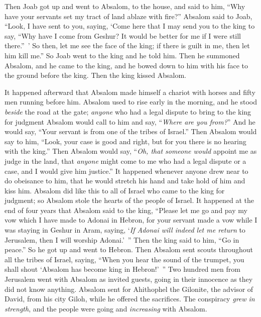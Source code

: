 \begin{biblechapter}
\verse Then Joab got up and went to Absalom, to the house, and said to him, “Why have your servants set my tract of land ablaze with fire?”
\verse Absalom said to Joab, “Look, I have sent to you, saying, ‘Come here that I may send you to the king to say, “Why have I come from Geshur? It would be better for me if I were still there.” ’ So then, let me see the face of the king; if there is guilt in me, then let him kill me.”
\verse So Joab went to the king and he told him. Then he summoned Absalom, and he came to the king, and he bowed down to him with his face to the ground before the king. Then the king kissed Absalom.
\end{biblechapter}

\begin{biblechapter} %
 It happened afterward that Absalom made himself a chariot with horses and fifty men running before him.
\verse Absalom used to rise early in the morning, and he stood \textit{beside} the road at the gate; \textit{anyone} who had a legal dispute to bring to the king for judgment Absalom would call to him and say, “\textit{Where are you from?}” And he would say, “Your servant is from one of the tribes of Israel.”
\verse Then Absalom would say to him, “Look, your case is good and right, but for you there is no hearing with the king.”
\verse Then Absalom would say, “\textit{Oh, that someone would} appoint me as judge in the land, that \textit{anyone} might come to me who had a legal dispute or a case, and I would give him justice.”
\verse It happened whenever anyone drew near to do obeisance to him, that he would stretch his hand and take hold of him and kiss him.
\verse Absalom did like this to all of Israel who came to the king for judgment; so Absalom stole the hearts of the people of Israel.
\verse It happened at the end of four years that Absalom said to the king, “Please let me go and pay my vow which I have made to Adonai in Hebron,
\verse for your servant made a vow while I was staying in Geshur in Aram, saying, ‘\textit{If Adonai will indeed let me return} to Jerusalem, then I will worship Adonai.’ ”
\verse Then the king said to him, “Go in peace.” So he got up and went to Hebron.
\verse Then Absalom sent scouts throughout all the tribes of Israel, saying, “When you hear the sound of the trumpet, you shall shout ‘Absalom has become king in Hebron!’ ”
\verse Two hundred men from Jerusalem went with Absalom as invited guests, going in their innocence as they did not know anything.
\verse Absalom sent for Ahithophel the Gilonite, the advisor of David, from his city Giloh, while he offered the sacrifices. The conspiracy \textit{grew in strength}, and the people were going and \textit{increasing} with Absalom.

\end{biblechapter}
